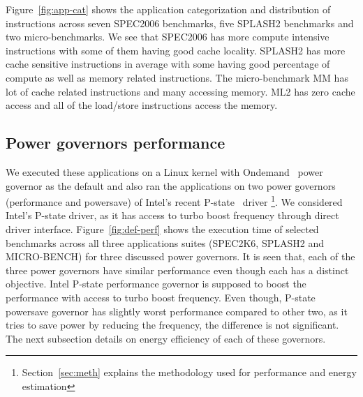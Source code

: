 Figure~\ref{fig:app-cat} shows the application categorization and distribution of instructions 
across seven SPEC2006 benchmarks, five SPLASH2 benchmarks and two micro-benchmarks. 
We see that SPEC2006 has more compute intensive instructions with some of them
having good cache locality. SPLASH2 has more cache sensitive instructions 
in average with some having good percentage of compute as well as memory related instructions. 
The micro-benchmark MM has lot of cache related instructions and many accessing memory.
ML2 has zero cache access and all of the load/store  instructions access the memory.

\subsection{Power governors performance}
We executed these applications on a Linux kernel with Ondemand~\cite{ondemand2006} power governor
as the default and also ran the applications on two power governors (performance and powersave) 
of Intel's recent P-state~\cite{pstate, rotem2012power} driver \footnote{
Section~\ref{sec:meth} explains the methodology used for performance and energy estimation}. 
We considered Intel's P-state driver, as it has access to turbo boost frequency 
through direct driver interface. Figure~\ref{fig:def-perf} shows the execution time 
of selected benchmarks across all three applications suites (SPEC2K6, SPLASH2 and MICRO-BENCH) for
three discussed power governors. It is seen that, each of the three power governors 
have similar performance even though each has a distinct objective.
Intel P-state performance governor is supposed to boost the performance
with access to turbo boost frequency. Even though, P-state powersave governor 
has slightly worst performance compared to other two, as it tries
to save power by reducing the frequency, the difference is not significant.
The next subsection details on energy efficiency of each of these governors. 

